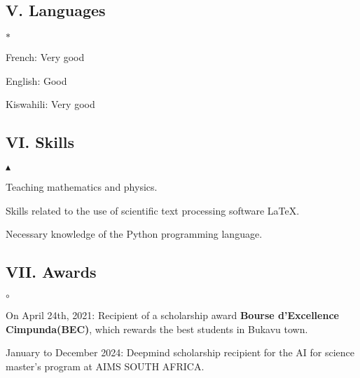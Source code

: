 \documentclass[10pt,a4paper,oneside]{article}
\begin{document}
\subsection*{V. Languages}
\begin{list}{$\ast $}{}
\item
French: Very good
\item
English: Good
\item
Kiswahili: Very good
\end{list}
\subsection*{VI. Skills}
\begin{list}{$ \blacktriangle $}{}
\item
Teaching mathematics and physics.
\item
Skills related to the use of scientific text processing software \LaTeX.
\item
Necessary knowledge of the Python programming language.
\end{list}

\subsection*{VII. Awards}
\begin{list}{$ \circ $}{}
	\item
	On April 24th, 2021: Recipient of a scholarship award \textbf{Bourse d'Excellence Cimpunda(BEC)}, which
	rewards the best students in Bukavu town.
	\item
	January to December 2024: Deepmind scholarship recipient for the AI for science master's program at AIMS SOUTH AFRICA.
\end{list}
\end{document}
